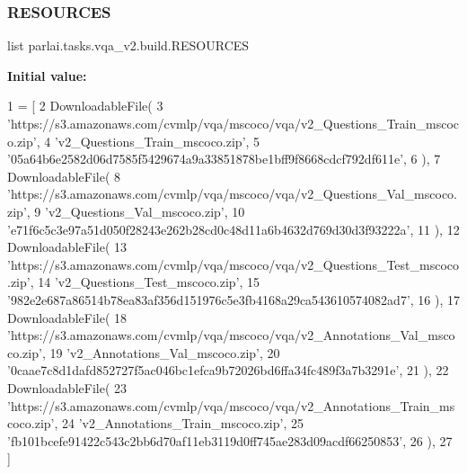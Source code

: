 \subsubsection{\texorpdfstring{R\+E\+S\+O\+U\+R\+C\+ES}{RESOURCES}}
{\footnotesize\ttfamily list parlai.\+tasks.\+vqa\+\_\+v2.\+build.\+R\+E\+S\+O\+U\+R\+C\+ES}

{\bfseries Initial value\+:}
\begin{DoxyCode}
1 =  [
2     DownloadableFile(
3         \textcolor{stringliteral}{'https://s3.amazonaws.com/cvmlp/vqa/mscoco/vqa/v2\_Questions\_Train\_mscoco.zip'},
4         \textcolor{stringliteral}{'v2\_Questions\_Train\_mscoco.zip'},
5         \textcolor{stringliteral}{'05a64b6e2582d06d7585f5429674a9a33851878be1bff9f8668cdcf792df611e'},
6     ),
7     DownloadableFile(
8         \textcolor{stringliteral}{'https://s3.amazonaws.com/cvmlp/vqa/mscoco/vqa/v2\_Questions\_Val\_mscoco.zip'},
9         \textcolor{stringliteral}{'v2\_Questions\_Val\_mscoco.zip'},
10         \textcolor{stringliteral}{'e71f6c5c3e97a51d050f28243e262b28cd0c48d11a6b4632d769d30d3f93222a'},
11     ),
12     DownloadableFile(
13         \textcolor{stringliteral}{'https://s3.amazonaws.com/cvmlp/vqa/mscoco/vqa/v2\_Questions\_Test\_mscoco.zip'},
14         \textcolor{stringliteral}{'v2\_Questions\_Test\_mscoco.zip'},
15         \textcolor{stringliteral}{'982e2e687a86514b78ea83af356d151976c5e3fb4168a29ca543610574082ad7'},
16     ),
17     DownloadableFile(
18         \textcolor{stringliteral}{'https://s3.amazonaws.com/cvmlp/vqa/mscoco/vqa/v2\_Annotations\_Val\_mscoco.zip'},
19         \textcolor{stringliteral}{'v2\_Annotations\_Val\_mscoco.zip'},
20         \textcolor{stringliteral}{'0caae7c8d1dafd852727f5ac046bc1efca9b72026bd6ffa34fc489f3a7b3291e'},
21     ),
22     DownloadableFile(
23         \textcolor{stringliteral}{'https://s3.amazonaws.com/cvmlp/vqa/mscoco/vqa/v2\_Annotations\_Train\_mscoco.zip'},
24         \textcolor{stringliteral}{'v2\_Annotations\_Train\_mscoco.zip'},
25         \textcolor{stringliteral}{'fb101bcefe91422c543c2bb6d70af11eb3119d0ff745ae283d09acdf66250853'},
26     ),
27 ]
\end{DoxyCode}
